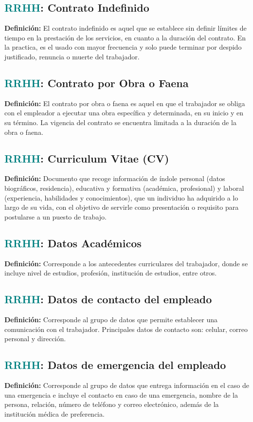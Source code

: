 \documentclass[12pt]{article}
\begin{document}
\subsection{\textcolor{teal}{RRHH}: Contrato Indefinido}
\textbf{Definición:} El contrato indefinido es aquel que se establece sin definir límites de tiempo en la prestación de los servicios, en cuanto a la duración del contrato. En la practica, es el usado con mayor frecuencia y solo puede terminar por despido justificado, renuncia o muerte del trabajador.
\subsection{\textcolor{teal}{RRHH}: Contrato por Obra o Faena}
\textbf{Definición:} El contrato por obra o faena es aquel en que el trabajador se obliga con el empleador a ejecutar una obra específica y determinada, en su inicio y en su término. La vigencia del contrato se encuentra limitada a la duración de la obra o faena.
\subsection{\textcolor{teal}{RRHH}: Curriculum Vitae (CV)}
\textbf{Definición:} Documento que recoge información de índole personal (datos biográficos, residencia), educativa y formativa (académica, profesional) y laboral (experiencia, habilidades y conocimientos), que un individuo ha adquirido a lo largo de su vida, con el objetivo de servirle como presentación o requisito para postularse a un puesto de trabajo.
\subsection{\textcolor{teal}{RRHH}: Datos Académicos}
\textbf{Definición:} Corresponde a los antecedentes curriculares del trabajador, donde se incluye nivel de estudios, profesión, institución de estudios, entre otros.
\subsection{\textcolor{teal}{RRHH}: Datos de contacto del empleado}
\textbf{Definición:} Corresponde al grupo de datos que permite establecer una comunicación con el trabajador. Principales datos de contacto son: celular, correo personal y dirección.
\subsection{\textcolor{teal}{RRHH}: Datos de emergencia del empleado}
\textbf{Definición:} Corresponde al grupo de datos que entrega información en el caso de una emergencia e incluye el contacto en caso de una emergencia, nombre de la persona, relación, número de teléfono y correo electrónico, además de la institución médica de preferencia.
\end{document}
